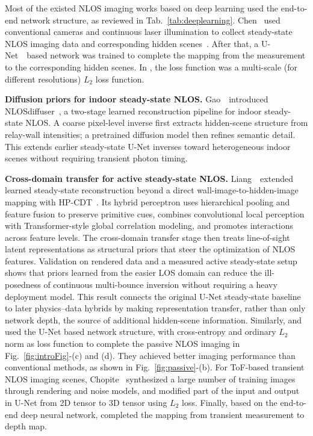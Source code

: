 Most of the existed NLOS imaging works based on deep learning used the end-to-end network structure, as reviewed in Tab.~\ref{tab:deeplearning}. Chen \etal~used conventional cameras and continuous laser illumination to collect steady-state NLOS imaging data and corresponding hidden scenes~\cite{chenSteadystateNonLineofSightImaging2019}. After that, a U-Net~\cite{ronnebergerUnetConvolutionalNetworks2015a}~based network was trained to complete the mapping from the measurement to the corresponding hidden scenes. In \cite{chenSteadystateNonLineofSightImaging2019}, the loss function was a multi-scale (for different resolutions) $L_2$ loss function.

\vspace{0.8mm}
\noindent \textbf{Diffusion priors for indoor steady-state NLOS.}
Gao~\etal~introduced NLOSdiffuser~\cite{gaoNLOSdiffuser2025}, a two-stage learned reconstruction pipeline for indoor steady-state NLOS. A coarse pixel-level inverse first extracts hidden-scene structure from relay-wall intensities; a pretrained diffusion model then refines semantic detail. This extends earlier steady-state U-Net inverses toward heterogeneous indoor scenes without requiring transient photon timing.

\vspace{0.8mm}
\noindent \textbf{Cross-domain transfer for active steady-state NLOS.}
Liang~\etal~extended learned steady-state reconstruction beyond a direct wall-image-to-hidden-image mapping with HP-CDT~\cite{liangHybridPerceptronSteadyState2025}. Its hybrid perceptron uses hierarchical pooling and feature fusion to preserve primitive cues, combines convolutional local perception with Transformer-style global correlation modeling, and promotes interactions across feature levels. The cross-domain transfer stage then treats line-of-sight latent representations as structural priors that steer the optimization of NLOS features. Validation on rendered data and a measured active steady-state setup shows that priors learned from the easier LOS domain can reduce the ill-posedness of continuous multi-bounce inversion without requiring a heavy deployment model. This result connects the original U-Net steady-state baseline to later physics--data hybrids by making representation transfer, rather than only network depth, the source of additional hidden-scene information.
Similarly, \cite{zhouNonlineofsightImagingPhong2020} and \cite{yuNonLineofSightImagingDeep2019} used the U-Net based network structure, with cross-entropy and ordinary $L_2$ norm as loss function to complete the passive NLOS imaging in Fig.~\ref{fig:introFig}-(c) and (d). They achieved better imaging performance than conventional methods\cite{tanakaPolarizedNonLineofSightImaging2020,saundersComputationalPeriscopyOrdinary2019}, as shown in Fig.~\ref{fig:passive}-(b).
For ToF-based transient NLOS imaging scenes, Chopite \etal~synthesized a large number of training images through rendering and noise models, and modified part of the input and output in U-Net from 2D tensor to 3D tensor using $L_2$ loss\cite{chopiteDeepNonLineofSightReconstruction2020}. Finally, based on the end-to-end deep neural network, \cite{chopiteDeepNonLineofSightReconstruction2020} completed the mapping from transient measurement to depth map.

